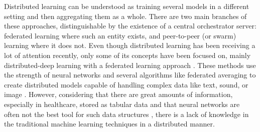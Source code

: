 
Distributed learning \cite{distributed} can be understood as training several models in a different setting and then aggregating them as a whole. There are two main branches of these approaches, distinguishable by the existence of a central orchestrator server: federated learning where such an entity exists, and peer-to-peer (or swarm) \cite{swarm_learning} learning where it does not. 
Even though distributed learning has been receiving a lot of attention recently, only some of its concepts have been focused on, mainly distributed-deep learning with a federated learning approach \cite{xuFederatedLearningHealthcare2021,leeFederatedLearningClinical2020}. These methods use the strength of neural networks and several algorithms like federated averaging to create distributed models capable of handling complex data like text, sound, or image \cite{prayitnoSystematicReviewFederated2021}. However, considering that there are great amounts of information, especially in healthcare, stored as tabular data \cite{alvarezsanchezTAQIHToolTabular2019,dimartinoExplainableAIClinical2022,payrovnaziriExplainableArtificialIntelligence2020} and that neural networks are often not the best tool for such data structures \cite{borisovDeepNeuralNetworks2022a}, there is a lack of knowledge in the traditional machine learning techniques in a distributed manner.

